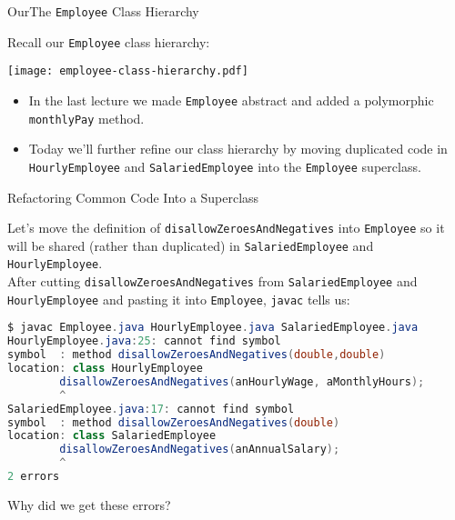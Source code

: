 \documentclass{beamer}
\author[Chris Simpkins] 
{Christopher Simpkins \\\texttt{chris.simpkins@gatech.edu}}
\institute[Georgia Tech] %
\date[CS 1331]{}
\title[\course] %
{\lesson}
\subtitle{}
\begin{document}
\begin{frame}
  \titlepage
\end{frame}


\begin{frame}[fragile]{OurThe {\tt Employee} Class Hierarchy}


Recall our {\tt Employee} class hierarchy:
\vspace{-.1in}
\begin{center}
\texttt{[image: employee-class-hierarchy.pdf]}
\end{center}
\begin{itemize}
\item In the last lecture we made {\tt Employee} abstract and added a polymorphic {\tt monthlyPay} method.
\item Today we'll further refine our class hierarchy by moving duplicated code in {\tt HourlyEmployee} and {\tt SalariedEmployee} into the {\tt Employee} superclass.
\end{itemize}
\end{frame}

\begin{frame}[fragile]{Refactoring Common Code Into a Superclass}


Let's move the definition of {\tt disallowZeroesAndNegatives} into {\tt Employee} so it will be shared (rather than duplicated) in {\tt SalariedEmployee} and {\tt HourlyEmployee}.\\
\vspace{.05in}
After cutting {\tt disallowZeroesAndNegatives} from {\tt SalariedEmployee} and {\tt HourlyEmployee} and pasting it into {\tt Employee}, {\tt javac} tells us:
\vspace{-.1in}
\begin{lstlisting}[language=Java]
$ javac Employee.java HourlyEmployee.java SalariedEmployee.java
HourlyEmployee.java:25: cannot find symbol
symbol  : method disallowZeroesAndNegatives(double,double)
location: class HourlyEmployee
        disallowZeroesAndNegatives(anHourlyWage, aMonthlyHours);
        ^
SalariedEmployee.java:17: cannot find symbol
symbol  : method disallowZeroesAndNegatives(double)
location: class SalariedEmployee
        disallowZeroesAndNegatives(anAnnualSalary);
        ^
2 errors
\end{lstlisting}
\vspace{-.1in}
Why did we get these errors?

\end{frame}
\end{document}
